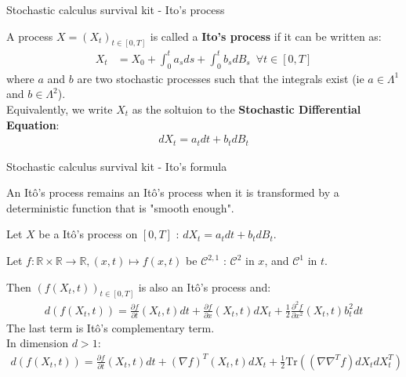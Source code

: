 \begin{frame}{Stochastic calculus survival kit - Ito's process}
    \begin{definition}
    A process $X = (X_t)_{t \in [0, T]}$ is called a \textbf{Ito's process} if it can be written as:
    \begin{align}
        \label{ito sde definition}
        X_t &= X_0 + \int_{0}^{t}a_s ds + \int_{0}^{t} b_s dB_s \,\,\, \forall t \in [0,T]
    \end{align}
    where $a$ and $b$ are two stochastic processes such that the integrals exist (ie $a \in  \Lambda^1$ and 
    $b \in \Lambda^2$).\\
    Equivalently, we write $X_t$ as the soltuion to the \textbf{Stochastic Differential Equation}:
    \begin{align*}
        dX_t = a_t dt + b_t dB_t
    \end{align*}
    \end{definition}
\end{frame}

%
%

\begin{frame}{Stochastic calculus survival kit - Ito's formula}
    
\begin{theorem}
An Itô's process remains an Itô's process when it is transformed by a deterministic function that is "smooth enough".

Let $X$ be a Itô's process on $[0,T]$ : $dX_t = a_tdt + b_t dB_t$.

Let $f : \mathbb{R} \times \mathbb{R} \rightarrow \mathbb{R}, (x,t) \mapsto f(x,t)$ be 
$\mathcal{C}^{2,1}$ : $\mathcal{C}^2$ in $x$, and $\mathcal{C}^1$ in $t$.

Then $(f(X_t,t))_{t \in [0,T]}$ is also an Itô's process and:
\begin{align}
    d\left( f(X_t,t) \right) = \frac{\partial f}{\partial t}(X_t,t) dt + \frac{\partial f}{\partial x}(X_t,t) dX_t + \frac{1}{2}\frac{\partial^2 f}{\partial x^2}(X_t,t)b_t^2 dt
\end{align}
The last term is Itô's complementary term.\\
In dimension $d > 1$:
\begin{align}
    d\left( f(X_t,t) \right) = \frac{\partial f}{\partial t}(X_t,t) dt + (\nabla f)^T (X_t,t) dX_t + \frac{1}{2}\text{Tr} \left( (\nabla \nabla^T f) dX_t dX_t^T \right)
\end{align}
\end{theorem}
\end{frame}

